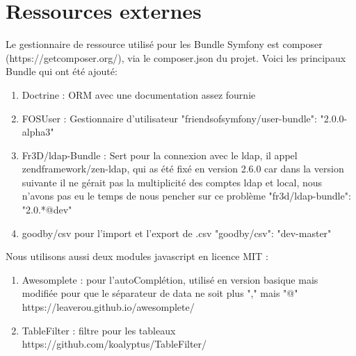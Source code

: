 \chapter{Ressources externes}
Le gestionnaire de ressource utilisé pour les Bundle Symfony est composer (https://getcomposer.org/), via le composer.json du projet.
Voici les principaux Bundle qui ont été ajouté:
 \newline
\begin{enumerate}

\item Doctrine : ORM avec une documentation assez fournie
 \newline
 \item FOSUser : Gestionnaire d'utilisateur
 \newline	"friendsofsymfony/user-bundle": "2.0.0-alpha3"
	 \newline
\item Fr3D/ldap-Bundle : Sert pour la connexion avec le ldap, il appel zendframework/zen-ldap, qui as été fixé en version 2.6.0 car dans la version suivante il ne gérait pas la multiplicité des comptes ldap et local, nous n'avons pas eu le temps de nous pencher sur ce problème
     \newline    "fr3d/ldap-bundle": "2.0.*@dev"
         \newline
\item goodby/csv pour l'import et l'export de .csv
    \newline     "goodby/csv": "dev-master"
 \newline
\end{enumerate}


Nous utilisons aussi deux modules javascript en licence MIT :

 \begin{enumerate}

\item Awesomplete : pour l'autoComplétion, utilisé en version basique mais modifiée pour que le séparateur de data ne soit plus "," mais "@"
\newline https://leaverou.github.io/awesomplete/
	\newline
\item TableFilter : filtre pour les tableaux
\newline https://github.com/koalyptus/TableFilter/	
\newline

\end{enumerate}